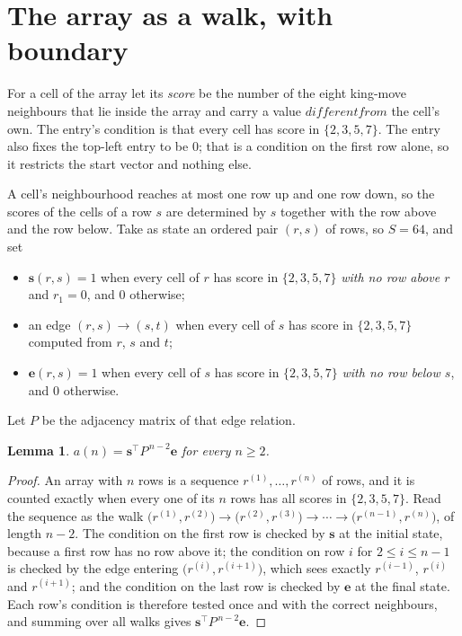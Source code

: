\documentclass[11pt,a4paper]{article}
\theoremstyle{plain}
\newtheorem{lemma}[theorem]{Lemma}
\theoremstyle{definition}
\begin{document}
\section{The array as a walk, with boundary}

For a cell of the array let its \emph{score} be the number of the eight king-move neighbours that lie inside
the array and carry a value $different from$ the cell's own. The entry's condition is that every cell
has score in $\{2,3,5,7\}$. The entry also fixes the top-left entry to be $0$; that is a condition on the first row alone, so it restricts the start vector and nothing else.

A cell's neighbourhood reaches at most one row up and one row down, so the scores of the
cells of a row $s$ are determined by $s$ together with the row above and the row below.
Take as state an ordered pair $(r,s)$ of rows, so $S=64$, and set
\begin{itemize}
\item $\mathbf{s}(r,s)=1$ when every cell of $r$ has score in $\{2,3,5,7\}$ \emph{with no row
above $r$} and $r_1=0$, and $0$ otherwise;
\item an edge $(r,s)\to(s,t)$ when every cell of $s$ has score in $\{2,3,5,7\}$ computed from
$r$, $s$ and $t$;
\item $\mathbf{e}(r,s)=1$ when every cell of $s$ has score in $\{2,3,5,7\}$ \emph{with no row
below $s$}, and $0$ otherwise.
\end{itemize}
Let $P$ be the adjacency matrix of that edge relation.

\begin{lemma}\label{lem:walk}
$a(n)=\mathbf{s}^{\!\top}P^{\,n-2}\mathbf{e}$ for every $n\ge2$.
\end{lemma}

\begin{proof}
An array with $n$ rows is a sequence $r^{(1)},\dots,r^{(n)}$ of rows, and it is counted
exactly when every one of its $n$ rows has all scores in $\{2,3,5,7\}$. Read the sequence as the
walk $\bigl(r^{(1)},r^{(2)}\bigr)\to\bigl(r^{(2)},r^{(3)}\bigr)\to\cdots\to
\bigl(r^{(n-1)},r^{(n)}\bigr)$, of length $n-2$. The condition on the first row is
checked by $\mathbf{s}$ at the initial state, because a first row has no row above it; the
condition on row $i$ for $2\le i\le n-1$ is checked by the edge entering
$\bigl(r^{(i)},r^{(i+1)}\bigr)$, which sees exactly $r^{(i-1)}$, $r^{(i)}$ and
$r^{(i+1)}$; and the condition on the last row is checked by $\mathbf{e}$ at the final
state. Each row's condition is therefore tested once and with the correct neighbours, and
summing over all walks gives $\mathbf{s}^{\!\top}P^{\,n-2}\mathbf{e}$.
\end{proof}
\end{document}
